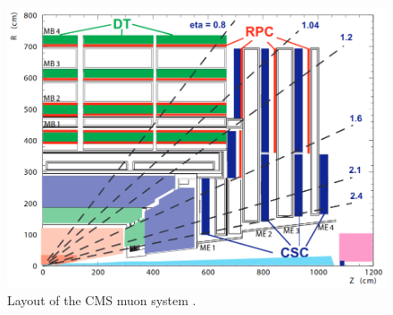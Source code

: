 \begin{figure}
\centering
\includegraphics[scale=0.4]{figures/lhc_and_cms/muon_system_layout.png}
\caption{Layout of the CMS muon system \cite{cms_tdr_v1}.}
\label{muon_system_layout}
\end{figure}